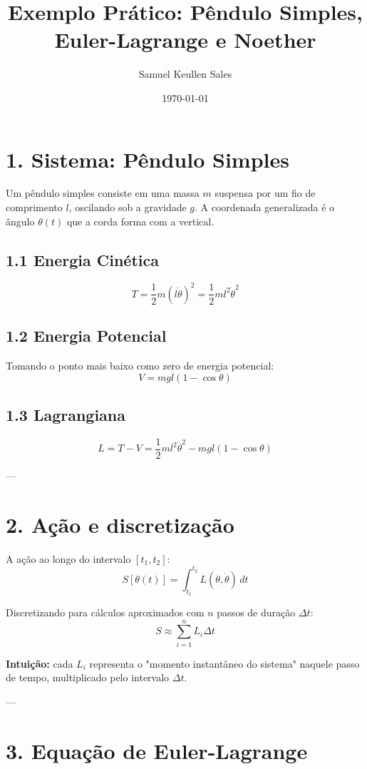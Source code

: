 \documentclass[12pt]{article}
\title{Exemplo Prático: Pêndulo Simples, Euler-Lagrange e Noether}
\author{Samuel Keullen Sales}
\date{\today}
\begin{document}
\maketitle

\section*{1. Sistema: Pêndulo Simples}

Um pêndulo simples consiste em uma massa $m$ suspensa por um fio de comprimento $l$, oscilando sob a gravidade $g$.  
A coordenada generalizada é o ângulo $\theta(t)$ que a corda forma com a vertical.

\subsection*{1.1 Energia Cinética}
\[
T = \frac{1}{2} m (l \dot{\theta})^2 = \frac{1}{2} m l^2 \dot{\theta}^2
\]

\subsection*{1.2 Energia Potencial}
Tomando o ponto mais baixo como zero de energia potencial:
\[
V = m g l (1 - \cos\theta)
\]

\subsection*{1.3 Lagrangiana}
\[
L = T - V = \frac{1}{2} m l^2 \dot{\theta}^2 - m g l (1 - \cos\theta)
\]

---

\section*{2. Ação e discretização}

A ação ao longo do intervalo $[t_1, t_2]$:
\[
S[\theta(t)] = \int_{t_1}^{t_2} L(\theta, \dot{\theta}) \, dt
\]

Discretizando para cálculos aproximados com $n$ passos de duração $\Delta t$:
\[
S \approx \sum_{i=1}^{n} L_i \Delta t
\]

\textbf{Intuição:} cada $L_i$ representa o "momento instantâneo do sistema" naquele passo de tempo, multiplicado pelo intervalo $\Delta t$.  

---

\section*{3. Equação de Euler-Lagrange}
\end{document}
